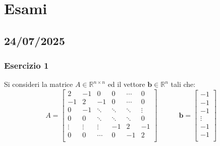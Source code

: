 \section{Esami}

\subsection{24/07/2025}

\subsubsection*{Esercizio 1}

Si consideri la matrice $A \in \mathbb{R}^{n \times n}$ ed il vettore $\mathbf{b} \in \mathbb{R}^{n}$ tali che:
\begin{equation*}
    A = \begin{bmatrix}
        2 & -1 & 0 & 0 & \cdots & 0 \\
        -1 & 2 & -1 & 0 & \cdots & 0 \\
        0 & -1 & \ddots & \ddots & \ddots & \vdots \\
        0 & 0 & \ddots & \ddots & \ddots & 0 \\
        \vdots & \vdots & \vdots & -1 & 2 & -1 \\
        0 & 0 & \cdots & 0 & -1 & 2 \\
    \end{bmatrix}
    \hspace{3em}
    \mathbf{b} = \begin{bmatrix}
        -1 \\
        -1 \\
        -1 \\
        \vdots \\
        -1 \\
        -1 \\
    \end{bmatrix}
\end{equation*}
